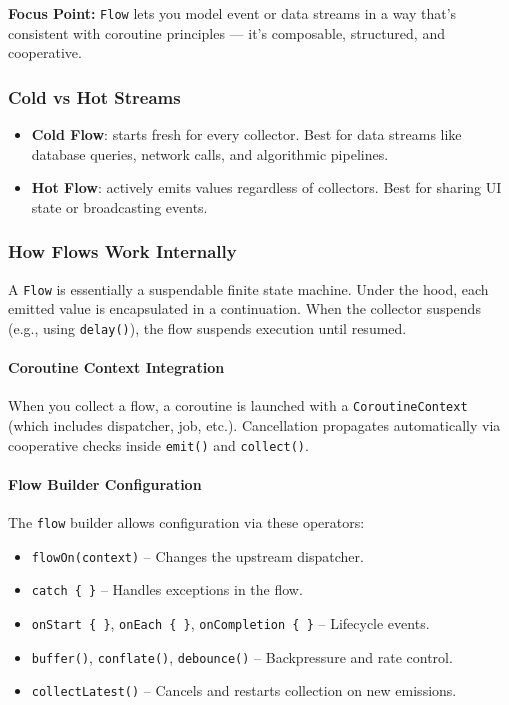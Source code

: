 \documentclass[a4paper,12pt]{article}
\begin{document}
\textbf{Focus Point:} \texttt{Flow} lets you model event or data streams in a way that's consistent with coroutine principles — it's composable, structured, and cooperative.

\subsubsection{Cold vs Hot Streams}

\begin{itemize}
  \item \textbf{Cold Flow}: starts fresh for every collector. Best for data streams like database queries, network calls, and algorithmic pipelines.
  \item \textbf{Hot Flow}: actively emits values regardless of collectors. Best for sharing UI state or broadcasting events.
\end{itemize}

\subsubsection{How Flows Work Internally}

A \texttt{Flow} is essentially a suspendable finite state machine. Under the hood, each emitted value is encapsulated in a continuation. When the collector suspends (e.g., using \texttt{delay()}), the flow suspends execution until resumed.

\paragraph{Coroutine Context Integration}
When you collect a flow, a coroutine is launched with a \texttt{CoroutineContext} (which includes dispatcher, job, etc.). Cancellation propagates automatically via cooperative checks inside \texttt{emit()} and \texttt{collect()}.

\paragraph{Flow Builder Configuration}
The \texttt{flow} builder allows configuration via these operators:

\begin{itemize}
  \item \texttt{flowOn(context)} – Changes the upstream dispatcher.
  \item \texttt{catch \{ \}} – Handles exceptions in the flow.
  \item \texttt{onStart \{ \}}, \texttt{onEach \{ \}}, \texttt{onCompletion \{ \}} – Lifecycle events.
  \item \texttt{buffer()}, \texttt{conflate()}, \texttt{debounce()} – Backpressure and rate control.
  \item \texttt{collectLatest()} – Cancels and restarts collection on new emissions.
\end{itemize}
\end{document}
